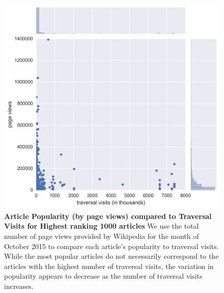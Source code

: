 \documentclass[pre,twocolumn,twoside,superscriptaddress,floatfix, aps, 10pt]{revtex4-1}
\begin{document}
\begin{figure}[tp!]
  \centering	
  \includegraphics[width=\columnwidth]{graphics/views_visits.png}
  \caption{
    \textbf{Article Popularity (by page views) compared to Traversal Visits 
    for Highest ranking 1000 articles}
    We use the total number of page views provided by Wikipedia for the month
    of October 2015 to compare each article's popularity to traversal visits.
    While the most popular articles do not necessarily correspond to the articles
    with the highest number of traversal visits, the variation in popularity appears to decrease as the number of traversal visits increases.
  }
  \label{fig:Views and Visits}

\end{figure}
\end{document}
